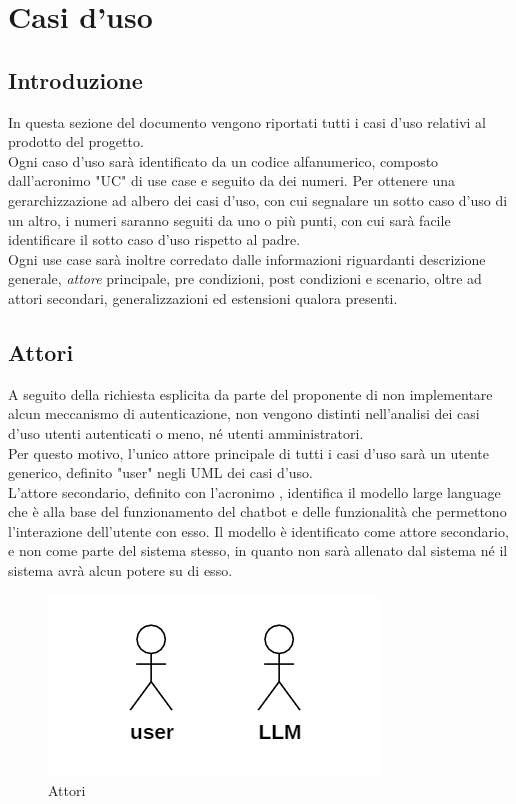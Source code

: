 \chapter{Casi d'uso}\label{sec:casi}
\section{Introduzione}
In questa sezione del documento vengono riportati tutti i casi d'uso relativi al prodotto del progetto.\\
Ogni caso d'uso sarà identificato da un codice alfanumerico, composto dall'acronimo "UC" di use case e seguito da dei numeri. Per ottenere una gerarchizzazione ad albero dei casi d'uso, con cui segnalare un sotto caso d'uso di un altro, i numeri saranno seguiti da uno o più punti, con cui sarà facile identificare il sotto caso d'uso rispetto al padre.\\
Ogni use case sarà inoltre corredato dalle informazioni riguardanti descrizione generale, \emph{attore} principale, pre condizioni, post condizioni e scenario, oltre ad attori secondari, generalizzazioni ed estensioni qualora presenti.

\section{Attori}
A seguito della richiesta esplicita da parte del proponente di non implementare alcun meccanismo di autenticazione, non vengono distinti nell'analisi dei casi d'uso utenti autenticati o meno, né utenti amministratori.\\
Per questo motivo, l'unico attore principale di tutti i casi d'uso sarà un utente generico, definito "user" negli UML dei casi d'uso.\\
L'attore secondario, definito con l'acronimo , identifica il modello large language che è alla base del funzionamento del chatbot e delle funzionalità che permettono l'interazione dell'utente con esso. Il modello è identificato come attore secondario, e non come parte del sistema stesso, in quanto non sarà allenato dal sistema né il sistema avrà alcun potere su di esso.

\begin{figure}[H]
    \centering
    \includegraphics[width=0.4\linewidth]{Attori.PNG}
    \caption{Attori}
    \label{fig:attori}
\end{figure}

